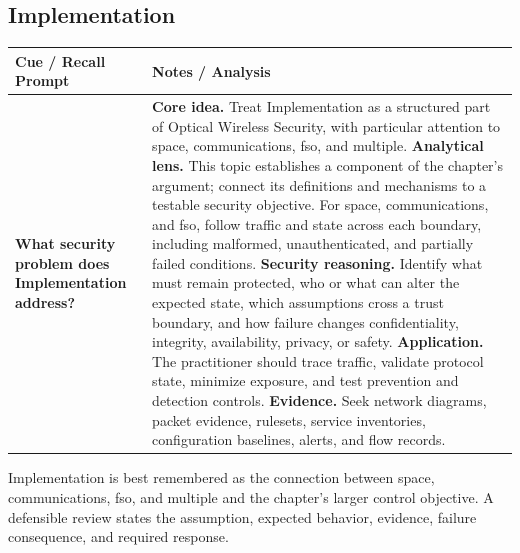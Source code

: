 \documentclass[11pt]{article}
\newcommand{\CornellHeader}{%
\rowcolor{Navy}\color{white}\bfseries Cue / Recall Prompt & \color{white}\bfseries Notes / Analysis\\\hline}
\newcommand{\CornellRow}[2]{%
\cellcolor{CueGray}\RaggedRight\textbf{#1} & \RaggedRight #2\\\hline}
\begin{document}
\subsection*{Implementation}
\begin{longtable}{>{\RaggedRight\arraybackslash}p{}|>{\RaggedRight\arraybackslash}p{}}
\CornellHeader
\CornellRow{What security problem does Implementation address?}{\textbf{Core idea.} Treat Implementation as a structured part of Optical Wireless Security, with particular attention to space, communications, fso, and multiple. \textbf{Analytical lens.} This topic establishes a component of the chapter's argument; connect its definitions and mechanisms to a testable security objective. For space, communications, and fso, follow traffic and state across each boundary, including malformed, unauthenticated, and partially failed conditions. \textbf{Security reasoning.} Identify what must remain protected, who or what can alter the expected state, which assumptions cross a trust boundary, and how failure changes confidentiality, integrity, availability, privacy, or safety. \textbf{Application.} The practitioner should trace traffic, validate protocol state, minimize exposure, and test prevention and detection controls. \textbf{Evidence.} Seek network diagrams, packet evidence, rulesets, service inventories, configuration baselines, alerts, and flow records.}
\end{longtable}
\begin{topicsummary}
Implementation is best remembered as the connection between space, communications, fso, and multiple and the chapter's larger control objective. A defensible review states the assumption, expected behavior, evidence, failure consequence, and required response.
\end{topicsummary}
\end{document}
